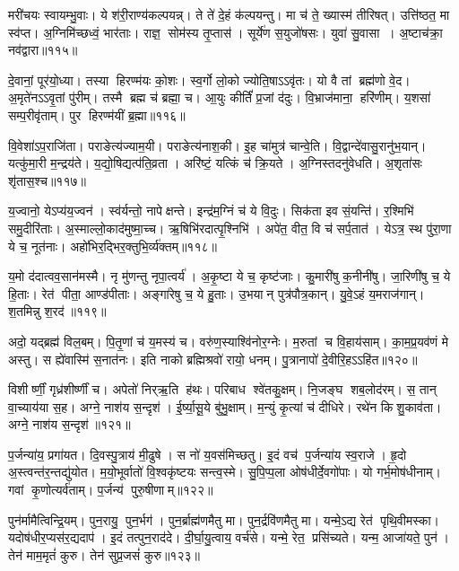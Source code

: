 मरी॑चयः स्वायम्भु॒वाः। ये श॑री॒राण्य॑कल्पयन्न्‌। 
ते ते॑ दे॒हं क॑ल्पयन्तु। मा च॑ ते॒ ख्यास्म॑ तीरिषत्‌। 
उत्ति॑ष्ठत॒ मा स्व॑प्त। अ॒ग्निमि॑च्छध्वं॒ भार॑ताः। 
राज्ञ॒ सोम॑स्य तृ॒प्तास॑। सूर्ये॑ण स॒युजो॑षसः। 
युवा॑ सु॒वासा। अ॒ष्टाच॑क्रा॒ नव॑द्वारा॥११५॥


दे॒वानां॒ पूर॑यो॒ध्या। तस्या हिरण्म॑यः को॒शः। 
स्व॒र्गो लो॒को ज्योति॒षाऽऽवृ॑तः। यो वै तां ब्रह्म॑णो वे॒द। 
अ॒मृते॑नऽऽवृ॒तां पु॑रीम्‌। तस्मै ब्रह्म च॑ ब्रह्मा॒ च। 
आ॒युः कीर्तिं॑ प्र॒जां द॑दुः। वि॒भ्राज॑माना॒ हरि॑णीम्‌। 
य॒शसा॑ सम्प॒रीवृ॑ताम्‌। पुर हिरण्म॑यीं ब्र॒ह्मा॥११६॥


वि॒वेशा॑ऽप॒राजि॑ता। पराङेत्य॑ज्याम॒यी। 
पराङेत्य॑नाश॒की। इ॒ह चा॑मुत्र॑ चान्वे॒ति। 
वि॒द्वान्दे॑वासु॒रानु॑भ॒यान्‌। यत्कु॑मा॒री म॒न्द्रय॑ते। 
य॒द्यो॒षिद्यत्प॑ति॒व्रता। अरि॑ष्टं॒ यत्किं च॑ क्रि॒यते। 
अ॒ग्निस्तदनु॑वेधति। अ॒शृता॑सः शृ॑तास॒श्च॥११७॥


य॒ज्वानो॒ येऽप्य॑य॒ज्वन॑। स्व॑र्यन्तो॒ नापेक्षन्ते। 
इन्द्र॑म॒ग्निं च॑ ये वि॒दुः। सिक॑ता इव सं॒यन्ति॑। 
र॒श्मिभि॑ समु॒दीरि॑ताः। अ॒स्माल्लो॒काद॑मुष्मा॒च्च। 
ऋ॒षिभि॑रदात्पृ॒श्निभि॑। 
अपे॑त॒ वीत॒ वि च॑ सर्प॒तात॑। येऽत्र॒ स्थ पु॑रा॒णा ये च॒ नूत॑नाः। 
अहो॑भिर॒द्भिर॒क्तु\-भि॒र्व्य॑क्तम्‌॥११८॥


य॒मो द॑दात्वव॒सान॑मस्मै। नृ मु॑णन्तु नृपा॒त्वर्य॑। 
अ॒कृ॒ष्टा ये च॒ कृष्ट॑जाः। कु॒मारी॑षु क॒नीनी॑षु। 
जा॒रिणी॑षु च॒ ये हि॒ताः। रेत॑ पीता॒ आण्ड॑पीताः। 
अङ्गा॑रेषु च॒ ये हु॒ताः। उ॒भयान्‌ पुत्र॑पौत्र॒कान्‌। 
यु॒वे॒ऽहं य॒मराज॑गान्‌। श॒तमिन्नु श॒रद॑॥११९॥


अदो॒ यद्ब्रह्म॑ विल॒बम्‌। पि॒तृ॒णां च॑ य॒मस्य॑ च। 
वरु॑ण॒स्याश्वि॑नोर॒ग्नेः। म॒रुतां च वि॒हाय॑साम्‌। 
का॒म॒प्र॒यव॑णं मे अस्तु। स ह्ये॑वास्मि॑ स॒नात॑नः। 
इति नाको ब्रह्मिश्रवो॑ रायो॒ धनम्‌। पु॒त्रानापो॑ दे॒वीरि॒हऽऽहि॑त॥१२०॥\anuvakamend


विशीर्ष्णीं॒ गृध्र॑शीर्ष्णीं च। अपेतो॑ निर्‌ऋ॒ति ह॑थः। 
परिबाध श्वे॑तकु॒क्षम्‌। नि॒जङ्घ शब॒लोद॑रम्‌। 
स॒ तान्‌ वा॒च्याय॑या स॒ह। अग्ने॒ नाश॑य स॒न्दृश॑। 
ई॒र्ष्या॒सू॒ये बु॑भु॒क्षाम्‌। म॒न्युं कृ॒त्यां च॑ दीधिरे। 
रथे॑न किशु॒काव॑ता। अग्ने॒ नाश॑य स॒न्दृश॑॥१२१॥\anuvakamend


प॒र्जन्या॑य॒ प्रगा॑यत। दि॒वस्पु॒त्राय॑ मी॒ढुषे। 
स नो॑ य॒वस॑मिच्छतु। इ॒दं वच॑ प॒र्जन्या॑य स्व॒राजे। 
हृ॒दो अ॒स्त्वन्त॑र॒न्तद्यु॑योत। म॒यो॒भूर्वातो॑ वि॒श्वकृ॑ष्टयः सन्त्व॒स्मे। 
सु॒पि॒प्प॒ला ओष॑धीर्दे॒वगो॑पाः। यो गर्भ॒मोष॑धीनाम्‌। 
गवां कृ॒णोत्यर्व॑ताम्‌। प॒र्जन्य॑ पुरु॒षीणाम्‌॥१२२॥\anuvakamend


पुन॑र्मामैत्विन्द्रि॒यम्‌। पुन॒रायु॒ पुन॒र्भग॑। 
पुन॒र्ब्राह्म॑णमैतु मा। पुन॒र्द्रवि॑णमैतु मा। 
यन्मे॒ऽद्य रेत॑ पृथि॒वीमस्का\sn{}। यदोष॑धीर॒प्यस॑र॒द्यदाप॑। 
इ॒दं तत्पुन॒राद॑दे। दी॒र्घा॒यु॒त्वाय॒ वर्च॑से। 
यन्मे॒ रेत॒ प्रसि॑च्यते। यन्म॒ आजा॑यते॒ पुन॑। 
तेन॑ माम॒मृतं॑ कुरु। तेन॑ सुप्र॒जसं॑ कुरु॥१२३॥\anuvakamend


